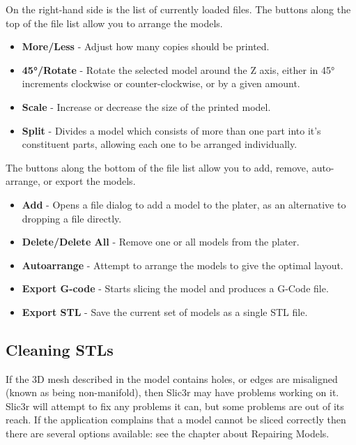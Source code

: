 On the right-hand side is the list of currently loaded files.  The buttons along the top of the file list allow you to arrange the models.
\begin{itemize}
	\item \textbf{More/Less}  - Adjust how many copies should be printed.
	\item \textbf{45°/Rotate}  - Rotate the selected model around the Z axis, either in 45° increments clockwise or counter-clockwise, or by a given amount.
	\item \textbf{Scale}  - Increase or decrease the size of the printed model.
	\item \textbf{Split}  - Divides a model which consists of more than one part into it's constituent parts, allowing each one to be arranged individually.
\end{itemize}

The buttons along the bottom of the file list allow you to add, remove, auto-arrange, or export the models.
\begin{itemize}
	\item \textbf{Add}  - Opens a file dialog to add a model to the plater, as an alternative to dropping a file directly.
	\item \textbf{Delete/Delete All}  - Remove one or all models from the plater.
	\item \textbf{Autoarrange}  - Attempt to arrange the models to give the optimal layout.
	\item \textbf{Export G-code}  - Starts slicing the model and produces a G-Code file.
	\item \textbf{Export STL}  - Save the current set of models as a single STL file.
\end{itemize}



\subsection{Cleaning STLs} %
\label{sub:cleaning_stls}
If the 3D mesh described in the model contains holes, or edges are misaligned (known as being non-manifold), then Slic3r may have problems working on it.  Slic3r will attempt to fix any problems it can, but some problems are out of its reach.  If the application complains that a model cannot be sliced correctly then there are several options available: see the chapter about Repairing Models.

